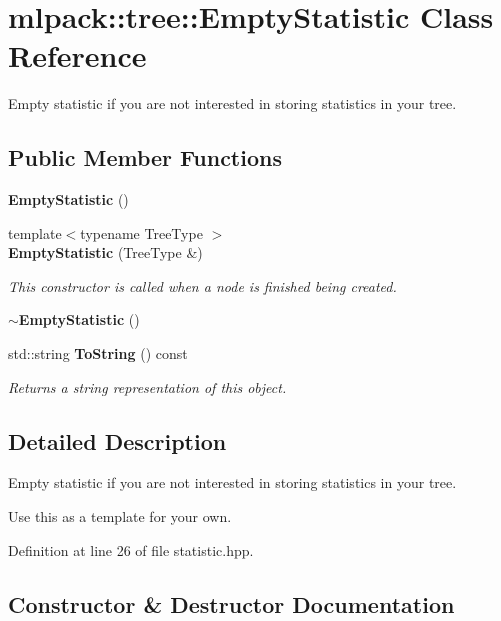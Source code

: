 \section{mlpack\-:\-:tree\-:\-:Empty\-Statistic Class Reference}
\label{classmlpack_1_1tree_1_1EmptyStatistic}


Empty statistic if you are not interested in storing statistics in your tree.  


\subsection*{Public Member Functions}
\begin{DoxyCompactItemize}
\item 
{\bf Empty\-Statistic} ()
\item 
{\footnotesize template$<$typename Tree\-Type $>$ }\\{\bf Empty\-Statistic} (Tree\-Type \&)
\begin{DoxyCompactList}\small\item\em This constructor is called when a node is finished being created. \end{DoxyCompactList}\item 
{\bf $\sim$\-Empty\-Statistic} ()
\item 
std\-::string {\bf To\-String} () const 
\begin{DoxyCompactList}\small\item\em Returns a string representation of this object. \end{DoxyCompactList}\end{DoxyCompactItemize}


\subsection{Detailed Description}
Empty statistic if you are not interested in storing statistics in your tree. 

Use this as a template for your own. 

Definition at line 26 of file statistic.\-hpp.



\subsection{Constructor \& Destructor Documentation}

